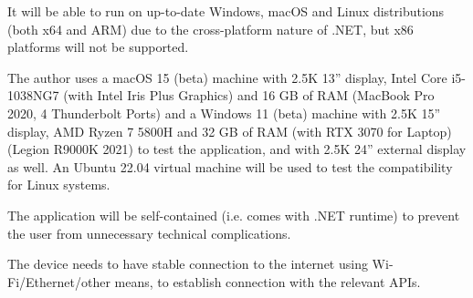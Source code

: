 It will be able to run on up-to-date Windows, macOS and Linux distributions (both x64 and ARM) due to the cross-platform nature of .NET, but x86 platforms will not be supported.

The author uses a macOS 15 (beta) machine with 2.5K 13'' display, Intel Core i5-1038NG7 (with Intel Iris Plus Graphics) and 16 GB of RAM (MacBook Pro 2020, 4 Thunderbolt Ports) and a Windows 11 (beta) machine with 2.5K 15'' display, AMD Ryzen 7 5800H and 32 GB of RAM (with RTX 3070 for Laptop) (Legion R9000K 2021) to test the application, and with 2.5K 24'' external display as well. An Ubuntu 22.04 virtual machine will be used to test the compatibility for Linux systems.

The application will be self-contained (i.e. comes with .NET runtime) to prevent the user from unnecessary technical complications.

The device needs to have stable connection to the internet using Wi-Fi/Ethernet/other means, to establish connection with the relevant APIs.